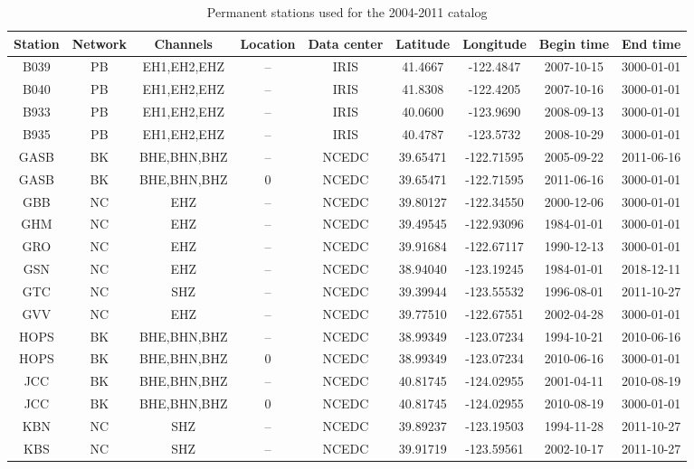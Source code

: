 \documentclass{article}
\begin{document}
\begin{table}
\caption{Permanent stations used for the 2004-2011 catalog}
\centering
\begin{tabular}{c c c c c c c c c}
\hline
Station & Network & Channels & Location & Data center & Latitude & Longitude & Begin time & End time \\
\hline
B039 & PB & EH1,EH2,EHZ & -- & IRIS & 41.4667 &  -122.4847 & 2007-10-15 & 3000-01-01 \\
B040 & PB & EH1,EH2,EHZ & -- & IRIS & 41.8308 &  -122.4205 & 2007-10-16 & 3000-01-01 \\
B933 & PB & EH1,EH2,EHZ & -- & IRIS & 40.0600 &  -123.9690 & 2008-09-13 & 3000-01-01 \\
B935 & PB & EH1,EH2,EHZ & -- & IRIS & 40.4787 &  -123.5732 & 2008-10-29 & 3000-01-01 \\
GASB & BK & BHE,BHN,BHZ & -- & NCEDC & 39.65471 & -122.71595 & 2005-09-22 & 2011-06-16 \\
GASB & BK & BHE,BHN,BHZ & 0 & NCEDC & 39.65471 & -122.71595 & 2011-06-16 & 3000-01-01 \\
GBB & NC & EHZ & -- & NCEDC & 39.80127 & -122.34550 & 2000-12-06 & 3000-01-01 \\
GHM & NC & EHZ & -- & NCEDC & 39.49545 & -122.93096 & 1984-01-01 & 3000-01-01 \\
GRO & NC & EHZ & -- & NCEDC & 39.91684 & -122.67117 & 1990-12-13 & 3000-01-01 \\
GSN & NC & EHZ & -- & NCEDC & 38.94040 & -123.19245 & 1984-01-01 & 2018-12-11 \\
GTC & NC & SHZ & -- & NCEDC & 39.39944 & -123.55532 & 1996-08-01 & 2011-10-27 \\
GVV & NC & EHZ & -- & NCEDC & 39.77510 & -122.67551 & 2002-04-28 & 3000-01-01 \\
HOPS & BK & BHE,BHN,BHZ & -- & NCEDC & 38.99349 & -123.07234 & 1994-10-21 & 2010-06-16 \\
HOPS & BK & BHE,BHN,BHZ & 0 & NCEDC & 38.99349 & -123.07234 & 2010-06-16 & 3000-01-01 \\
JCC & BK & BHE,BHN,BHZ & -- & NCEDC & 40.81745 & -124.02955 & 2001-04-11 & 2010-08-19 \\
JCC & BK & BHE,BHN,BHZ & 0 & NCEDC & 40.81745 & -124.02955 & 2010-08-19 & 3000-01-01 \\
KBN & NC & SHZ & -- & NCEDC & 39.89237 & -123.19503 & 1994-11-28 & 2011-10-27 \\
KBS & NC & SHZ & -- & NCEDC & 39.91719 & -123.59561 & 2002-10-17 & 2011-10-27 \\

\end{tabular}
\end{table}
\end{document}
